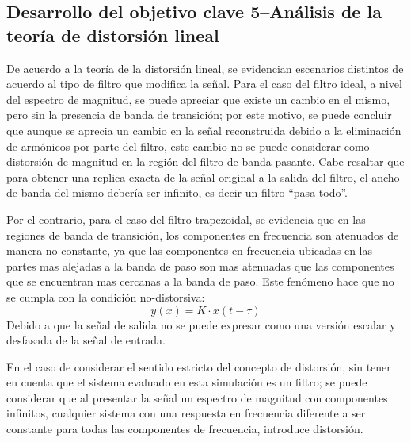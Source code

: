 \subsection{Desarrollo del objetivo clave 5--Análisis de la teoría de distorsión lineal}

De acuerdo a la teoría de la distorsión lineal, se evidencian escenarios distintos de acuerdo al tipo de filtro que modifica la señal. Para el caso del filtro ideal, a nivel del espectro de magnitud, se puede apreciar que existe un cambio en el mismo, pero sin la presencia de banda de transición; por este motivo, se puede concluir que aunque se aprecia un cambio en la señal reconstruida debido a la eliminación de armónicos por parte del filtro, este cambio no se puede considerar como distorsión de magnitud en la región del filtro de banda pasante. Cabe resaltar que para obtener una replica exacta de la señal original a la salida del filtro, el ancho de banda del mismo debería ser infinito, es decir un filtro ``pasa todo''.

Por el contrario, para el caso del filtro trapezoidal, se evidencia que en las regiones de banda de transición, los componentes en frecuencia son atenuados de manera no constante, ya que las componentes en frecuencia ubicadas en las partes mas alejadas a la banda de paso son mas atenuadas que las componentes que se encuentran mas cercanas a la banda de paso. Este fenómeno hace que no se cumpla con la condición no-distorsiva:
\begin{equation*}
	y(x)=K\cdot x(t-\tau)
\end{equation*}
Debido a que la señal de salida no se puede expresar como una versión escalar y desfasada de la señal de entrada.

En el caso de considerar el sentido estricto del concepto de distorsión, sin tener en cuenta que el sistema evaluado en esta simulación es un filtro; se puede considerar que al presentar la señal un espectro de magnitud con componentes infinitos, cualquier sistema con una respuesta en frecuencia diferente a ser constante para todas las componentes de frecuencia, introduce distorsión.



